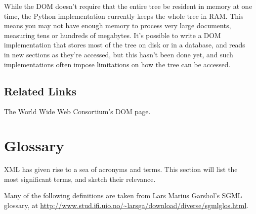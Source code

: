 \documentclass{howto}
\begin{document}
While the DOM doesn't require that the entire tree be resident in
memory at one time, the Python implementation currently keeps the
whole tree in RAM.  This means you may not have enough memory to
process very large documents, measuring tens or hundreds of megabytes.
It's possible to write a DOM implementation that stores most of the
tree on disk or in a database, and reads in new sections as they're
accessed, but this hasn't been done yet, and such implementations
often impose limitations on how the tree can be accessed.


\subsection{Related Links}

\begin{definitions}
%
The World Wide Web Consortium's DOM page.

\end{definitions}

\section{Glossary}

XML has given rise to a sea of acronyms and terms.  This section will
list the most significant terms, and sketch their relevance.

Many of the following definitions are taken from Lars Marius Garshol's
SGML glossary, at \url{http://www.stud.ifi.uio.no/\~larsga/download/diverse/sgmlglos.html}.
\end{document}

